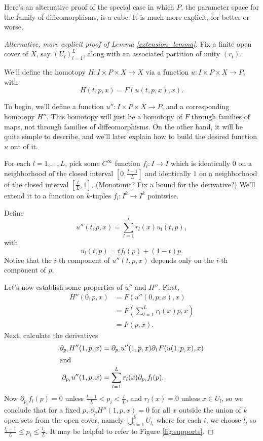 
Here's an alternative proof of the special case in which $P$, the parameter space for the family of diffeomorphisms, is a cube. It is much more explicit, for better or worse.

\begin{proof}[Alternative, more explicit proof of Lemma \ref{extension_lemma}]


Fix a finite open cover of $X$, say $(U_l)_{l=1}^L$, along with an
associated partition of unity $(r_l)$.

We'll define the homotopy $H:I \times P \times X \to X$ via a function
$u:I \times P \times X \to P$, with
\begin{equation*}
H(t,p,x) = F(u(t,p,x),x).
\end{equation*}

To begin, we'll define a function $u'' : I \times P \times X \to P$, and
a corresponding homotopy $H''$. This homotopy will just be a homotopy of
$F$ through families of maps, not through families of diffeomorphisms. On
the other hand, it will be quite simple to describe, and we'll later
explain how to build the desired function $u$ out of it.

For each $l = 1, \ldots, L$, pick some $C^\infty$ function $f_l : I \to
I$ which is identically $0$ on a neighborhood of the closed interval $[0,\frac{l-1}{L}]$
and identically $1$ on a neighborhood of the closed interval $[\frac{l}{L},1]$. (Monotonic?
Fix a bound for the derivative?) We'll extend it to a function on
$k$-tuples $f_l : I^k \to I^k$ pointwise.

Define $$u''(t,p,x) = \sum_{l=1}^L r_l(x) u_l(t,p),$$ with
$$u_l(t,p) = t f_l(p) + (1-t)p.$$ Notice that the $i$-th component of $u''(t,p,x)$ depends only on the $i$-th component of $p$.

Let's now establish some properties of $u''$ and $H''$. First,
\begin{align*}
H''(0,p,x) & = F(u''(0,p,x),x) \\
           & = F(\sum_{l=1}^L r_l(x) p, x) \\
           & = F(p,x).
\end{align*}
Next, calculate the derivatives
\begin{align*}
\partial_{p_i} H''(1,p,x) & = \partial_{p_i}u''(1,p,x) \partial_1 F(u(1,p,x),x) \\
\intertext{and}
\partial_{p_i}u''(1,p,x) & = \sum_{l=1}^L r_l(x) \partial_{p_i} f_l(p).
\end{align*}
Now $\partial_{p_i} f_l(p) = 0$ unless $\frac{l-1}{L} < p_i < \frac{l}{L}$, and $r_l(x) = 0$ unless $x \in U_l$,
so we conclude that for a fixed $p$, $\partial_p H''(1,p,x) = 0$ for all $x$ outside the union of $k$ open sets from the open cover, namely
$\bigcup_{i=1}^k U_{l_i}$ where for each $i$, we choose $l_i$ so $\frac{l_i -1}{L} \leq p_i \leq \frac{l_i}{L}$. It may be helpful to refer to Figure \ref{fig:supports}.


\end{proof}
